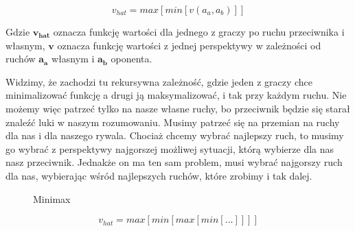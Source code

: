 \begin{equation}
v_{hat} = max[min[v(a_a, a_b)]]
\end{equation}

\noindent Gdzie $\boldsymbol{v_{hat}}$ oznacza funkcję wartości dla jednego z graczy po ruchu przeciwnika i własnym, $\boldsymbol{v}$ oznacza funkcję wartości z jednej perspektywy w zależności od ruchów $\boldsymbol{a_a}$ własnym i $\boldsymbol{a_b}$ oponenta.\newline

Widzimy, że zachodzi tu rekursywna zależność, gdzie jeden z graczy chce minimalizować funkcję a drugi ją maksymalizować, i tak przy każdym ruchu. Nie możemy więc patrzeć tylko na nasze własne ruchy, bo przeciwnik będzie się starał znaleźć luki w naszym rozumowaniu. Musimy patrzeć się na przemian na ruchy dla nas i dla naszego rywala. Chociaż chcemy wybrać najlepszy ruch, to musimy go wybrać z perspektywy najgorszej możliwej sytuacji, którą wybierze dla nas nasz przeciwnik. Jednakże on ma ten sam problem, musi wybrać najgorszy ruch dla nas, wybierając wśród najlepszych ruchów, które zrobimy i tak dalej.

\clearpage
\begin{figure}[H]
\centering

\caption{Minimax}
\end{figure}
\clearpage

\begin{equation}
v_{hat} = max[min[max[min[…]]]]
\end{equation}

